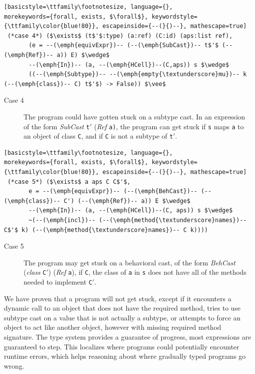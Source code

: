 \documentclass[runnningheads]{tex/llncs}
\begin{document}
\begin{lstlisting}[basicstyle=\ttfamily\footnotesize, language={}, 
morekeywords={forall, exists, $\forall$}, keywordstyle={\ttfamily\color{blue!80}}, escapeinside={--(}{)--}, mathescape=true]
 (*case 4*) ($\exists$ (t$'$:type) (a:ref) (C:id) (aps:list ref),
       (e = --(\emph{equivExpr})-- (--(\emph{SubCast})-- t$'$ (--(\emph{Ref})-- a)) E) $\wedge$
       --(\emph{In})-- (a, --(\emph{HCell})--(C,aps)) s $\wedge$
       ((--(\emph{Subtype})-- --(\emph{empty{\textunderscore}mu})-- k (--(\emph{class})-- C) t$'$) -> False)) $\vee$
\end{lstlisting}
\begin{description}
  \item[Case 4] The program could have gotten stuck on a subtype cast.  In
    an expression of the form \emph{SubCast} \texttt{t$'$} (\emph{Ref}
    \texttt{a)}, the program can get stuck if \verb|s| maps \verb|a| to an
    object of class \verb|C|, and if \verb|C| is not a subtype of
    \verb|t|$'$.
\end{description}

\begin{lstlisting}[basicstyle=\ttfamily\footnotesize, language={}, 
morekeywords={forall, exists, $\forall$}, keywordstyle={\ttfamily\color{blue!80}}, escapeinside={--(}{)--}, mathescape=true]
 (*case 5*) ($\exists$ a aps C C$'$, 
       e = --(\emph{equivExpr})-- (--(\emph{BehCast})-- (--(\emph{class})-- C') (--(\emph{Ref})-- a)) E $\wedge$
       --(\emph{In})-- (a, --(\emph{HCell})--(C, aps)) s $\wedge$
       ~(--(\emph{incl})-- (--(\emph{method{\textunderscore}names})-- C$'$ k) (--(\emph{method{\textunderscore}names})-- C k))))
\end{lstlisting}
\begin{description}
  \item[Case 5] The program may get stuck on a behavioral cast, of the form
    \emph{BehCast} (\emph{class} \texttt{C}$'$) (\emph{Ref} \texttt{a}), if
    \verb|C|, the class of \verb|a| in \verb|s| does not have all of the
    methods needed to implement \verb|C|$'$.
\end{description}

We have proven that a \kafka program will not get stuck, except if it
encounters a dynamic call to an object that does not have the required
method, tries to use subtype cast on a value that is not actually a subtype,
or attempts to force an object to act like another object, however with
missing required method signature.  The \kafka type system provides a
guarantee of progress, most expressions are guaranteed to step.  This
localizes where \kafka programs could potentially encounter runtime errors,
which helps reasoning about where gradually typed programs go wrong.
\end{document}

